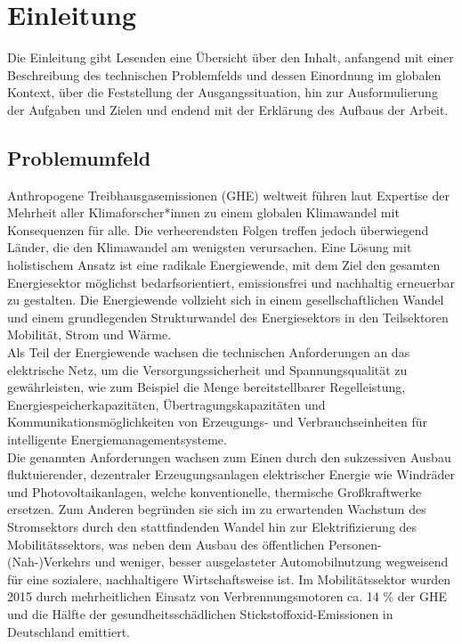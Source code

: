 \chapter{Einleitung}
	\label{Kap1}
Die Einleitung gibt Lesenden eine Übersicht über den Inhalt, anfangend mit einer Beschreibung des technischen Problemfelds und dessen Einordnung im globalen Kontext, über die Feststellung der Ausgangssituation, hin zur Ausformulierung der Aufgaben und Zielen und endend mit der Erklärung des Aufbaus der Arbeit.

\section{Problemumfeld}		%
	Anthropogene Treibhausgasemissionen (\ac{GHE}) weltweit führen laut Expertise der Mehrheit aller Klimaforscher*innen zu einem globalen Klimawandel mit Konsequenzen für alle. \cite{IPCC_Climate_Change_2007} Die verheerendsten Folgen treffen jedoch überwiegend Länder, die den Klimawandel am wenigsten verursachen. Eine Lösung mit holistischem Ansatz ist eine radikale Energiewende, mit dem Ziel den gesamten Energiesektor möglichst bedarfsorientiert, emissionsfrei und nachhaltig erneuerbar zu gestalten. Die Energiewende vollzieht sich in einem gesellschaftlichen Wandel und einem grundlegenden Strukturwandel des Energiesektors in den Teilsektoren Mobilität, Strom und Wärme. \\

	Als Teil der Energiewende wachsen die technischen Anforderungen an das elektrische Netz, um die Versorgungssicherheit und Spannungsqualität zu gewährleisten, wie zum Beispiel die Menge bereitstellbarer Regelleistung, Energiespeicherkapazitäten, Übertragungskapazitäten und Kommunikationsmöglichkeiten von Erzeugungs- und Verbrauchseinheiten für intelligente Energiemanagementsysteme. \\
    
    Die genannten Anforderungen wachsen zum Einen durch den sukzessiven Ausbau  fluktuierender, dezentraler Erzeugungsanlagen elektrischer Energie wie Windräder und Photovoltaikanlagen, welche konventionelle, thermische Großkraftwerke ersetzen. Zum Anderen begründen sie sich im zu erwartenden Wachstum des Stromsektors durch den stattfindenden Wandel hin zur Elektrifizierung des Mobilitätssektors, was neben dem Ausbau des öffentlichen Personen-(Nah-)Verkehrs und weniger, besser ausgelasteter Automobilnutzung wegweisend für eine sozialere, nachhaltigere Wirtschaftsweise ist. \cite{FraunhoferISI_Emobility_2011} Im Mobilitätssektor wurden 2015 durch mehrheitlichen Einsatz von Verbrennungsmotoren ca. 14 \% der \ac{GHE} und die Hälfte der gesundheitsschädlichen Stickstoffoxid-Emissionen in Deutschland emittiert. \cite{UBA_GHE} \cite{UBA_NOx} \cite{FraunhoferISI_Emobility_2011}\\ 






